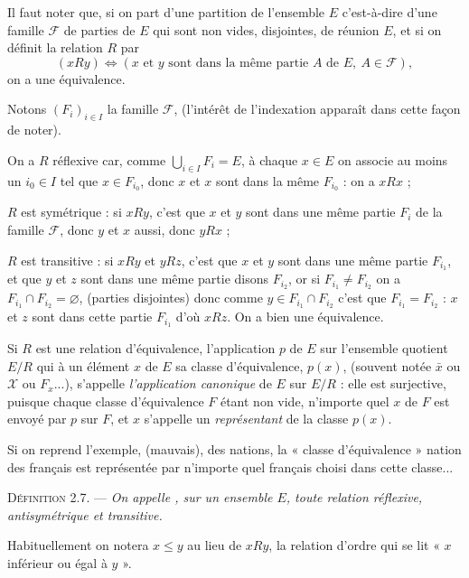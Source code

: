 Il faut noter que, si on part d'une partition de l'ensemble $E$ c'est-à-dire d'une famille $\mathcal F$ de parties de $E$ qui sont non vides, disjointes, de réunion $E$, et si on définit la relation $R$ par
\[
(xRy)\Leftrightarrow(x\text{ et }y\text{ sont dans la même partie }A\text{ de }E,\ A\in\mathcal F),
\]
on a une équivalence.

Notons $(F_i)_{i\in I}$ la famille $\mathcal F$, (l'intérêt de l'indexation apparaît dans cette façon de noter).

On a $R$ réflexive car, comme $\bigcup_{i\in I}F_i=E$, à chaque $x\in E$ on associe au moins un $i_0\in I$ tel que $x\in F_{i_0}$, donc $x$ et $x$ sont dans la même $F_{i_0}$ : on a $xRx$ ;

$R$ est symétrique : si $xRy$, c'est que $x$ et $y$ sont dans une même partie $F_i$ de la famille $\mathcal F$, donc $y$ et $x$ aussi, donc $yRx$ ;

$R$ est transitive : si $xRy$ et $yRz$, c'est que $x$ et $y$ sont dans une même partie $F_{i_1}$, et que $y$ et $z$ sont dans une même partie disons $F_{i_2}$, or si $F_{i_1}\ne F_{i_2}$ on a $F_{i_1}\cap F_{i_2}=\varnothing$, (parties disjointes) donc comme $y\in F_{i_1}\cap F_{i_2}$ c'est que $F_{i_1}=F_{i_2}$ : $x$ et $z$ sont dans cette partie $F_{i_1}$ d'où $xRz$. On a bien une équivalence. \bookend

Si $R$ est une relation d'équivalence, l'application $p$ de $E$ sur l'ensemble quotient $E/R$ qui à un élément $x$ de $E$  sa classe d'équivalence, $p(x)$, (souvent notée $\bar x$ ou $\mathcal X$ ou $F_x$...), s'appelle \emph{l'application canonique} de $E$ sur $E/R$ : elle est surjective, puisque chaque classe d'équivalence $F$ étant non vide, n'importe quel $x$ de $F$ est envoyé par $p$ sur $F$, et $x$ s'appelle un \emph{représentant} de la classe $p(x)$.

Si on reprend l'exemple, (mauvais), des nations, la « classe d'équivalence » nation des français est représentée par n'importe quel français choisi dans cette classe...


\medskip\noindent\textsc{Définition 2.7.} --- \emph{On appelle , sur un ensemble $E$, toute relation réflexive, antisymétrique et transitive.}

Habituellement on notera $x\le y$ au lieu de $xRy$, la relation d'ordre qui se lit « $x$ inférieur ou égal à $y$ ».

